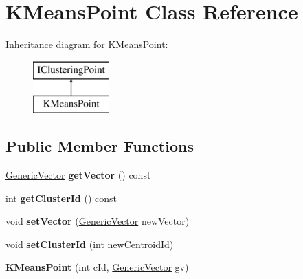 \hypertarget{classKMeansPoint}{}\section{K\+Means\+Point Class Reference}
\label{classKMeansPoint}
Inheritance diagram for K\+Means\+Point\+:\begin{figure}[H]
\begin{center}
\leavevmode
\includegraphics[height=2.000000cm]{classKMeansPoint}
\end{center}
\end{figure}
\subsection*{Public Member Functions}
\begin{DoxyCompactItemize}
\item 
\mbox{\label{classKMeansPoint_aa4656fff49410b33987055431ba58083}} 
\hyperlink{classGenericVector}{Generic\+Vector} {\bfseries get\+Vector} () const
\item 
\mbox{\label{classKMeansPoint_a2850a53998048945705a3262d836f153}} 
int {\bfseries get\+Cluster\+Id} () const
\item 
\mbox{\label{classKMeansPoint_a0a83a5f8ffa1b94b0f0e4dc4511ef940}} 
void {\bfseries set\+Vector} (\hyperlink{classGenericVector}{Generic\+Vector} new\+Vector)
\item 
\mbox{\label{classKMeansPoint_a4de80f3770990f507f226fe11764e19f}} 
void {\bfseries set\+Cluster\+Id} (int new\+Centroid\+Id)
\item 
\mbox{\label{classKMeansPoint_adf92a609a1b137a18026bf4bffe1938f}} 
{\bfseries K\+Means\+Point} (int c\+Id, \hyperlink{classGenericVector}{Generic\+Vector} gv)
\end{DoxyCompactItemize}
